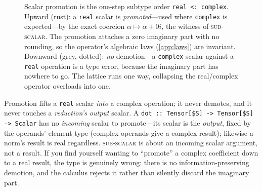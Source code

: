 \begin{figure}[t]
\centering
{}
\caption[The scalar-promotion subtype lattice]{Scalar promotion is the one-step
subtype order \lstinline[style=l4style]!real <: complex!. Upward (rust): a
\texttt{real} scalar is \emph{promoted}---used where \texttt{complex} is
expected---by the exact coercion $\alpha\mapsto\alpha+0i$, the witness of
\textsc{sub-scalar}. The promotion attaches a zero imaginary part with no rounding,
so the operator's algebraic laws (\cref{app:laws}) are invariant. Downward (grey,
dotted): \emph{no} demotion---a \texttt{complex} scalar against a \texttt{real}
operation is a type error, because the imaginary part has nowhere to go. The
lattice runs one way, collapsing the real/complex operator overloads into one.}
\label{fig:b-lattice}
\end{figure}

\begin{pitfall}
Promotion lifts a \texttt{real} scalar \emph{into} a complex operation; it never
demotes, and it never touches a \emph{reduction's output} scalar. A
\lstinline[style=l4style]|dot :: Tensor[$S] -> Tensor[$S] -> Scalar| has no
\emph{incoming} scalar to promote---its scalar is the \emph{output}, fixed by the
operands' element type (complex operands give a complex result); likewise a norm's
result is real regardless. \textsc{sub-scalar} is about an incoming scalar
argument, not a result. If you find yourself wanting to ``promote'' a complex
coefficient down to a real result, the type is genuinely wrong: there is no
information-preserving demotion, and the calculus rejects it rather than silently
discard the imaginary part.
\end{pitfall}

